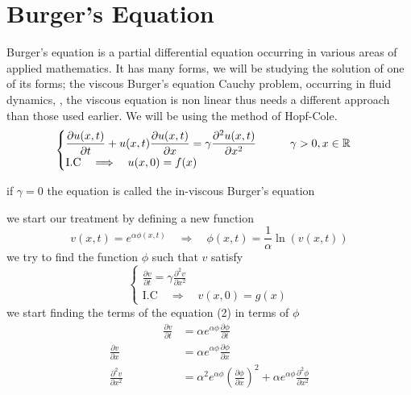 \documentclass[]{article}
\begin{document}
\section{Burger's Equation}
Burger's equation  is a partial differential equation occurring in various areas of applied mathematics. It has many forms, we will be studying the solution of one of its forms; the viscous Burger's equation Cauchy problem, occurring in fluid dynamics, , the viscous equation is non linear thus needs a different approach than those used earlier. We will be using the method of Hopf-Cole.
\begin{equation}
    \begin{cases}
        \displaystyle \frac{\partial u(x,t)}{\partial t} + u(x,t)\frac{\partial u(x,t)}{\partial x} = \gamma \frac{\partial^2 u(x,t)}{\partial x^2} \quad\quad\quad \gamma > 0 , x \in \mathbb{R}
        \\
        \text{I.C} \quad \Longrightarrow \quad u(x,0) = f(x)
    \end{cases}
\end{equation}
\begin{enrichment*}{}
    if $\gamma = 0$ the equation is called the in-viscous Burger's equation
\end{enrichment*}
we start our treatment by defining a new function
\[
v(x,t) = e^{\alpha\phi(x,t)}  \quad \Longrightarrow \quad \phi(x,t) = \frac{1}{\alpha}\ln(v(x,t))
\]
we try to find the function $\phi$ such that $v$ satisfy
\begin{equation}
    \begin{cases}
        \displaystyle \frac{\partial v}{\partial t} = \gamma \frac{\partial^2 v}{\partial x^2}
        \\
        \text{I.C} \quad \Longrightarrow \quad v(x,0) = g(x)
    \end{cases}
\end{equation}
we start finding the terms of the equation (2) in terms of $\phi$
\begin{align*}
\hspace{2cm}
\frac{\partial v}{\partial t} &= \alpha e^{\alpha\phi} \frac{\partial \phi}{\partial t}
\\
\frac{\partial v}{\partial x} &= \alpha e^{\alpha\phi} \frac{\partial \phi}{\partial x} 
\\
\frac{\partial^2 v}{\partial x^2} &= \alpha^2 e^{\alpha \phi} {\left(\frac{\partial \phi}{\partial x}\right)}^2 + \alpha e^{\alpha\phi} \frac{\partial^2 \phi}{\partial x^2}
\end{align*}
\end{document}
